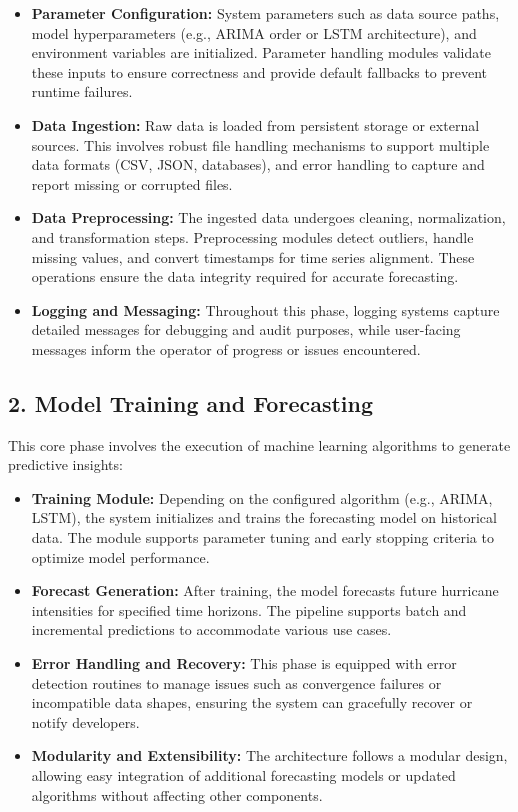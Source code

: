 \begin{itemize}
	\item \textbf{Parameter Configuration:} System parameters such as data source paths, model hyperparameters (e.g., ARIMA order or LSTM architecture), and environment variables are initialized. Parameter handling modules validate these inputs to ensure correctness and provide default fallbacks to prevent runtime failures.
	\item \textbf{Data Ingestion:} Raw data is loaded from persistent storage or external sources. This involves robust file handling mechanisms to support multiple data formats (CSV, JSON, databases), and error handling to capture and report missing or corrupted files.
	\item \textbf{Data Preprocessing:} The ingested data undergoes cleaning, normalization, and transformation steps. Preprocessing modules detect outliers, handle missing values, and convert timestamps for time series alignment. These operations ensure the data integrity required for accurate forecasting.
	\item \textbf{Logging and Messaging:} Throughout this phase, logging systems capture detailed messages for debugging and audit purposes, while user-facing messages inform the operator of progress or issues encountered.
\end{itemize}

\subsection*{2. Model Training and Forecasting}

This core phase involves the execution of machine learning algorithms to generate predictive insights:

\begin{itemize}
	\item \textbf{Training Module:} Depending on the configured algorithm (e.g., ARIMA, LSTM), the system initializes and trains the forecasting model on historical data. The module supports parameter tuning and early stopping criteria to optimize model performance.
	\item \textbf{Forecast Generation:} After training, the model forecasts future hurricane intensities for specified time horizons. The pipeline supports batch and incremental predictions to accommodate various use cases.
	\item \textbf{Error Handling and Recovery:} This phase is equipped with error detection routines to manage issues such as convergence failures or incompatible data shapes, ensuring the system can gracefully recover or notify developers.
	\item \textbf{Modularity and Extensibility:} The architecture follows a modular design, allowing easy integration of additional forecasting models or updated algorithms without affecting other components.
\end{itemize}

